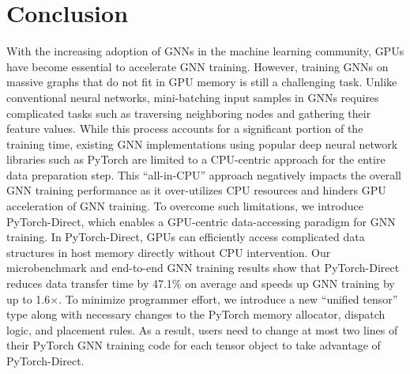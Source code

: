 \section{Conclusion}
With the increasing adoption of GNNs in the machine learning community, GPUs have become essential to accelerate GNN training.
However, training GNNs on massive graphs that do not fit in GPU memory is still a challenging task.
Unlike conventional neural networks, mini-batching input samples
in GNNs requires complicated tasks such as traversing neighboring nodes and gathering their feature values.
While this process accounts for a significant portion of the training time, existing GNN implementations using popular deep neural network libraries such as PyTorch are limited to a CPU-centric approach for the entire data preparation step.
This ``all-in-CPU'' approach negatively impacts the overall GNN training performance as it over-utilizes CPU resources and hinders GPU acceleration of GNN training.
To overcome such limitations, we introduce PyTorch-Direct, which enables a GPU-centric data-accessing paradigm for GNN training.
In PyTorch-Direct, GPUs can efficiently access complicated data structures in host memory directly without CPU intervention.
Our microbenchmark and end-to-end GNN training results show that PyTorch-Direct reduces data transfer time by 47.1\% on average and speeds up GNN training by up to 1.6$\times$.
To minimize programmer effort, we introduce a new ``unified tensor'' type along with necessary changes to the PyTorch memory allocator, dispatch logic, and placement rules. 
As a result, users need to change at most two lines of their PyTorch GNN training code for each tensor object to take advantage of PyTorch-Direct.

